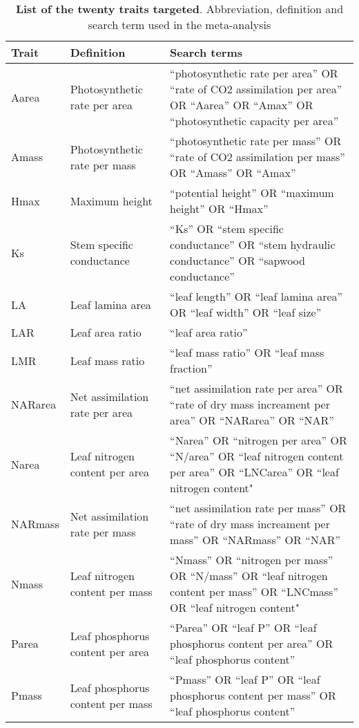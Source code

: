 \documentclass[a4paper,11pt]{article}
\begin{document}
\begin{appendices}
\begin{table}[h!]
\centering
\caption{\textbf{List of the twenty traits targeted}. Abbreviation,
definition and search term used in the meta-analysis}
\label{tab:lit_search}
\vspace{0.5cm}
{\footnotesize
\begin{tabular}{p{3cm}p{3cm}p{8cm}}
  \hline
Trait & Definition & Search terms \\
  \hline
Aarea & Photosynthetic rate per area & ``photosynthetic rate per area'' OR ``rate of CO2 assimilation per area'' OR ``Aarea'' OR ``Amax'' OR ``photosynthetic capacity per area'' \\
  Amass & Photosynthetic rate per mass & ``photosynthetic rate per mass'' OR ``rate of CO2 assimilation per mass'' OR ``Amass'' OR ``Amax'' \\
  Hmax & Maximum height & ``potential height'' OR ``maximum height'' OR ``Hmax'' \\
  Ks & Stem specific conductance & ``Ks'' OR ``stem specific conductance'' OR ``stem hydraulic conductance'' OR ``sapwood conductance'' \\
  LA & Leaf lamina area & ``leaf length'' OR ``leaf lamina area'' OR ``leaf width'' OR ``leaf size'' \\
  LAR & Leaf area ratio & ``leaf area ratio'' \\
  LMR & Leaf mass ratio & ``leaf mass ratio'' OR ``leaf mass fraction'' \\
  NARarea & Net assimilation rate per area &  ``net assimilation rate per area'' OR ``rate of dry mass increament per area'' OR ``NARarea'' OR ``NAR'' \\
  Narea & Leaf nitrogen content per area & ``Narea'' OR ``nitrogen per area'' OR ``N/area'' OR ``leaf nitrogen content per area'' OR ``LNCarea'' OR ``leaf nitrogen content" \\
  NARmass & Net assimilation rate per mass &  ``net assimilation rate per mass'' OR ``rate of dry mass increament per mass'' OR ``NARmass'' OR ``NAR'' \\
  Nmass & Leaf nitrogen content per mass & ``Nmass'' OR ``nitrogen per mass'' OR ``N/mass'' OR ``leaf nitrogen content per mass'' OR ``LNCmass'' OR ``leaf nitrogen content" \\
  Parea & Leaf phosphorus content per area & ``Parea'' OR ``leaf P'' OR  ``leaf phosphorus content per area''  OR ``leaf phosphorus content'' \\
  Pmass & Leaf phosphorus content per mass & ``Pmass'' OR ``leaf P'' OR  ``leaf phosphorus content per mass'' OR ``leaf phosphorus content'' \\

\end{tabular}}
\end{table}
\end{appendices}
\end{document}
